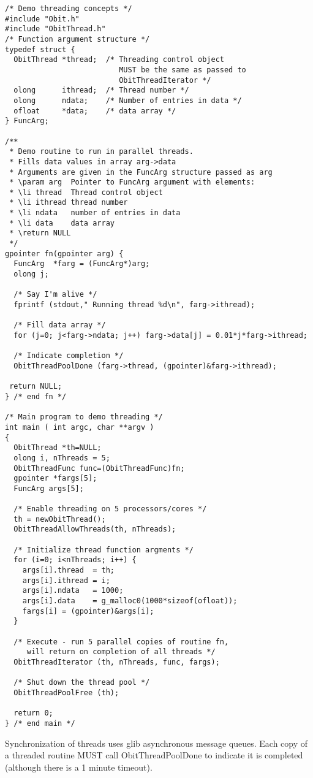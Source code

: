 \documentclass[11pt]{article}
\begin{document}
\begin{verbatim}
/* Demo threading concepts */
#include "Obit.h"
#include "ObitThread.h"
/* Function argument structure */
typedef struct {
  ObitThread *thread;  /* Threading control object 
                          MUST be the same as passed to
                          ObitThreadIterator */
  olong      ithread;  /* Thread number */
  olong      ndata;    /* Number of entries in data */
  ofloat     *data;    /* data array */
} FuncArg;

/**
 * Demo routine to run in parallel threads.
 * Fills data values in array arg->data
 * Arguments are given in the FuncArg structure passed as arg
 * \param arg  Pointer to FuncArg argument with elements:
 * \li thread  Thread control object
 * \li ithread thread number
 * \li ndata   number of entries in data
 * \li data    data array
 * \return NULL
 */
gpointer fn(gpointer arg) {
  FuncArg  *farg = (FuncArg*)arg;
  olong j;
  
  /* Say I'm alive */
  fprintf (stdout," Running thread %d\n", farg->ithread);

  /* Fill data array */
  for (j=0; j<farg->ndata; j++) farg->data[j] = 0.01*j*farg->ithread;
 
  /* Indicate completion */
  ObitThreadPoolDone (farg->thread, (gpointer)&farg->ithread);
  
 return NULL;
} /* end fn */

/* Main program to demo threading */
int main ( int argc, char **argv )
{
  ObitThread *th=NULL;
  olong i, nThreads = 5;
  ObitThreadFunc func=(ObitThreadFunc)fn;
  gpointer *fargs[5];
  FuncArg args[5];
  
  /* Enable threading on 5 processors/cores */
  th = newObitThread();
  ObitThreadAllowThreads(th, nThreads);

  /* Initialize thread function argments */
  for (i=0; i<nThreads; i++) {
    args[i].thread  = th;
    args[i].ithread = i;
    args[i].ndata   = 1000;
    args[i].data    = g_malloc0(1000*sizeof(ofloat));
    fargs[i] = (gpointer)&args[i];
  }

  /* Execute - run 5 parallel copies of routine fn,
     will return on completion of all threads */
  ObitThreadIterator (th, nThreads, func, fargs);
  
  /* Shut down the thread pool */
  ObitThreadPoolFree (th);

  return 0;
} /* end main */
\end{verbatim}

Synchronization of threads uses glib asynchronous message queues.
Each copy of a threaded routine MUST call ObitThreadPoolDone to
indicate it is completed (although there is a 1 minute timeout).
\end{document}
